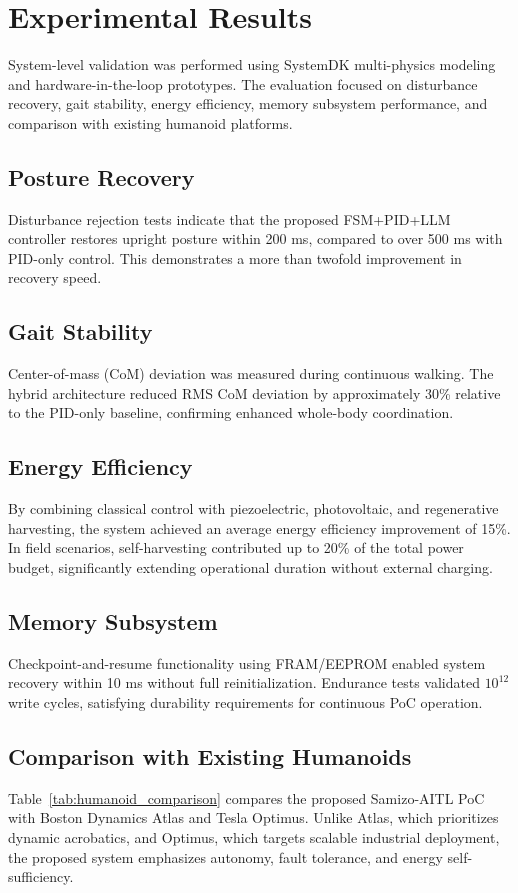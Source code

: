 \section{Experimental Results}
System-level validation was performed using SystemDK multi-physics modeling
and hardware-in-the-loop prototypes. The evaluation focused on disturbance recovery,
gait stability, energy efficiency, memory subsystem performance, and comparison
with existing humanoid platforms.

\subsection{Posture Recovery}
Disturbance rejection tests indicate that the proposed FSM+PID+LLM controller
restores upright posture within 200 ms,
compared to over 500 ms with PID-only control.
This demonstrates a more than twofold improvement in recovery speed.

\subsection{Gait Stability}
Center-of-mass (CoM) deviation was measured during continuous walking.
The hybrid architecture reduced RMS CoM deviation by approximately 30\%
relative to the PID-only baseline,
confirming enhanced whole-body coordination.

\subsection{Energy Efficiency}
By combining classical control with piezoelectric, photovoltaic, and regenerative harvesting,
the system achieved an average energy efficiency improvement of 15\%.
In field scenarios, self-harvesting contributed up to 20\% of the total power budget,
significantly extending operational duration without external charging.

\subsection{Memory Subsystem}
Checkpoint-and-resume functionality using FRAM/EEPROM
enabled system recovery within 10 ms without full reinitialization.
Endurance tests validated $10^{12}$ write cycles,
satisfying durability requirements for continuous PoC operation.

\subsection{Comparison with Existing Humanoids}
Table~\ref{tab:humanoid_comparison} compares the proposed Samizo-AITL PoC 
with Boston Dynamics Atlas and Tesla Optimus.
Unlike Atlas, which prioritizes dynamic acrobatics,
and Optimus, which targets scalable industrial deployment,
the proposed system emphasizes autonomy, fault tolerance,
and energy self-sufficiency.


